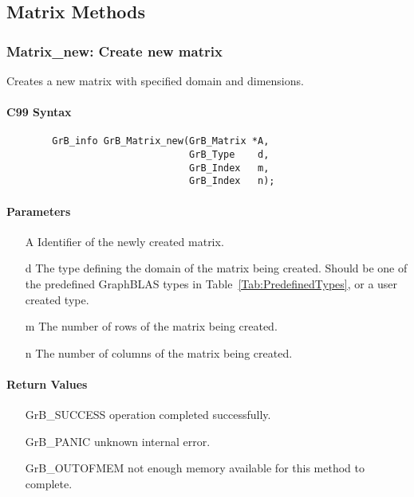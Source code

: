 \subsection{Matrix Methods}

\subsubsection{{\sf Matrix\_new}: Create new matrix}

Creates a new matrix with specified domain and dimensions.

\paragraph{C99 Syntax}

\begin{verbatim}
        GrB_info GrB_Matrix_new(GrB_Matrix *A,
                                GrB_Type    d,
                                GrB_Index   m,
                                GrB_Index   n);
\end{verbatim}

\paragraph{Parameters}

\begin{itemize}[leftmargin=1.1in]
    \item[{\sf A}] Identifier of the newly created matrix.
    \item[{\sf d}] The type defining the domain of the matrix being created. Should be one of the predefined
    GraphBLAS types in Table~\ref{Tab:PredefinedTypes}, or a user created type.
    \item[{\sf m}] The number of rows of the matrix being created.
    \item[{\sf n}] The number of columns of the matrix being created.
\end{itemize}


\paragraph{Return Values}

\begin{itemize}[leftmargin=2.1in]
\item[{\sf GrB\_SUCCESS}]   operation completed successfully.
\item[{\sf GrB\_PANIC}]     unknown internal error.
\item[{\sf GrB\_OUTOFMEM}]  not enough memory available for this method to complete.
\end{itemize}

